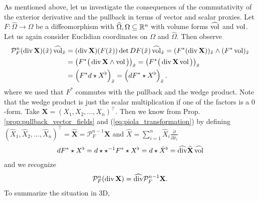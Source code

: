 \documentclass[../master_thesis.tex]{subfiles}
\begin{document}
As mentioned above, let us investigate the consequences of the 
commutativity of the exterior derivative and the pullback in terms 
of vector and scalar proxies.
Let $F: \widehat{\Omega} \rightarrow \Omega$ be a diffeomorphism with 
$\widehat{\Omega}, \Omega \subseteq \mathbb{R}^n$ with volume forms $\widehat{\operatorname{vol}}$ and 
$\operatorname{vol}$. Let us again consider Euclidian 
coordinates on $\Omega$ and $\widehat{\Omega}$. Then observe
\begin{align*}
    \mathcal{P}^n_F (\operatorname{div} \mathbf{X})(\hat{x}) \,\widehat{\operatorname{vol}}_{\hat{x}}
    &= (\operatorname{div} \mathbf{X})(F(\hat{x}))  \det DF(\hat{x}) \,\widehat{\operatorname{vol}}_{\hat{x}} 
    = ( F^* (\operatorname{div} \mathbf{X}))_{\hat{x}} \wedge (F^* \operatorname{vol})_{\hat{x}}
    \\ &= \left( F^* \big( \operatorname{div} \mathbf{X} \wedge \operatorname{vol} \big) \right)_{\hat{x}}
    =  \left( F^* \big( \operatorname{div} \mathbf{X} \operatorname{vol} \big) \right)_{\hat{x}}
    \\ &= \left( F^* d \star X^\flat  \right)_{\hat{x}}
    = \left( d F^* \star X^\flat  \right)_{\hat{x}}.
\end{align*}
where we used that $F^*$ commutes with the pullback and the 
wedge product. Note that the wedge product is just the scalar multiplication 
if one of the factors is a $0$-form. Take $\mathbf{X} = (X_1, X_2, ..., X_n)^\top$. 
Then we know from Prop.\,\ref{prop:pullback_vector_fields} and (\ref{eq:piola_transformation})
by defining $(\hat{X}_1, \hat{X}_2, ..., \hat{X}_n)^\top = \hat{\mathbf{X}} = \mathcal{P}^{n-1}_F \mathbf{X}$
and $\hat{X} = \sum_{i=1}^n \hat{X}_i \frac{\partial}{\partial \hat{x}_i}$
\begin{align*}
    d F^* \star X^\flat = d \star \star^{-1} F^* \star X^\flat 
    = d \star \hat{X}^\flat = \widehat{\operatorname{div}} \mathbf{\widehat{X}} \, \widehat{\operatorname{vol}}
\end{align*}
and we recognize 
\begin{align*}
    \mathcal{P}^{n}_F (\operatorname{div} \mathbf{X}) = \widehat{\operatorname{div}} \mathcal{P}^{n-1}_F \mathbf{X}.
\end{align*}
To summarize the situation in 3D,
\end{document}
